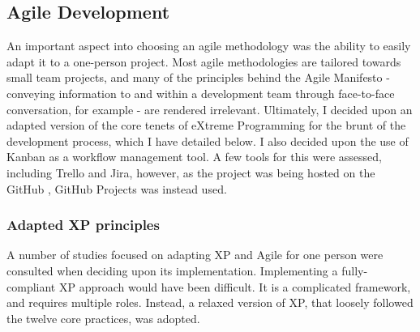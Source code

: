 \subsection{Agile Development}

An important aspect into choosing an agile methodology was the ability to easily adapt it to a one-person project. Most agile methodologies are tailored towards small team projects, and many of the principles behind the Agile Manifesto - conveying information to and within a development team through face-to-face conversation, for example - are rendered irrelevant. Ultimately, I decided upon an adapted version of the core tenets of eXtreme Programming for the brunt of the development process, which I have detailed below. I also decided upon the use of Kanban as a workflow management tool. A few tools for this were assessed, including Trello and Jira, however, as the project was being hosted on the GitHub , GitHub Projects was instead used. 

\subsubsection{Adapted XP principles}

A number of studies focused on adapting XP and Agile for one person were consulted when deciding upon its implementation\cite{Nystrom2011}. Implementing a fully-compliant XP approach would have been difficult. It is a complicated framework, and requires multiple roles. Instead, a relaxed version of XP, that loosely followed the twelve core practices, was adopted\cite{Agarwal2008}.


